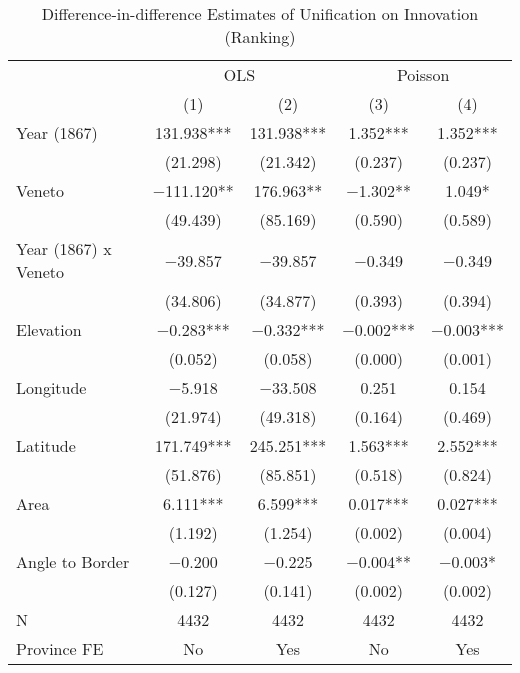 \begin{table}[!h]

\caption{\label{tab:did_analysis_rank}Difference-in-difference Estimates of Unification on Innovation (Ranking)}
\centering
\fontsize{9}{11}\selectfont
\begin{threeparttable}
\begin{tabular}[t]{lcccc}
\toprule
\multicolumn{1}{c}{ } & \multicolumn{2}{c}{OLS} & \multicolumn{2}{c}{Poisson} \\
\cmidrule(l{3pt}r{3pt}){2-3} \cmidrule(l{3pt}r{3pt}){4-5}
  & (1) & (2) & (3) & (4)\\
\midrule
Year (1867) & \num{131.938}*** & \num{131.938}*** & \num{1.352}*** & \num{1.352}***\\
 & (\num{21.298}) & (\num{21.342}) & (\num{0.237}) & (\num{0.237})\\
Veneto & \num{-111.120}** & \num{176.963}** & \num{-1.302}** & \num{1.049}*\\
 & (\num{49.439}) & (\num{85.169}) & (\num{0.590}) & (\num{0.589})\\
Year (1867) x Veneto & \num{-39.857} & \num{-39.857} & \num{-0.349} & \num{-0.349}\\
 & (\num{34.806}) & (\num{34.877}) & (\num{0.393}) & (\num{0.394})\\
Elevation & \num{-0.283}*** & \num{-0.332}*** & \num{-0.002}*** & \num{-0.003}***\\
 & (\num{0.052}) & (\num{0.058}) & (\num{0.000}) & (\num{0.001})\\
Longitude & \num{-5.918} & \num{-33.508} & \num{0.251} & \num{0.154}\\
 & (\num{21.974}) & (\num{49.318}) & (\num{0.164}) & (\num{0.469})\\
Latitude & \num{171.749}*** & \num{245.251}*** & \num{1.563}*** & \num{2.552}***\\
 & (\num{51.876}) & (\num{85.851}) & (\num{0.518}) & (\num{0.824})\\
Area & \num{6.111}*** & \num{6.599}*** & \num{0.017}*** & \num{0.027}***\\
 & (\num{1.192}) & (\num{1.254}) & (\num{0.002}) & (\num{0.004})\\
Angle to Border & \num{-0.200} & \num{-0.225} & \num{-0.004}** & \num{-0.003}*\\
 & (\num{0.127}) & (\num{0.141}) & (\num{0.002}) & (\num{0.002})\\
\midrule
N & \num{4432} & \num{4432} & \num{4432} & \num{4432}\\
Province FE & No & Yes & No & Yes\\

\end{tabular}
\end{threeparttable}
\end{table}

